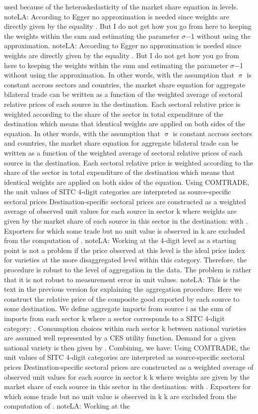 \documentclass[12pt,twoside,a4paper,notitlepage]{article}
\begin{document}
used because of the heteroskedasticity of the market share equation in levels. noteLA: According to Egger no approximation is needed since weights are directly given by the equality . But I do not get how you go from here to keeping the weights within the sum and estimating the parameter ${\sigma}$${-}$1 without using the approximation. noteLA: According to Egger no approximation is needed since weights are directly given by the equality . But I do not get how you go from here to keeping the weights within the sum and estimating the parameter ${\sigma}$${-}$1 without using the approximation. In other words, with the assumption that ${\upsigma}$ is constant accross sectors and countries, the market share equation for aggregate bilateral trade can be written as a function of the weighted average of sectoral relative prices of each source in the destination. Each sectoral relative price is weighted according to the share of the sector in total expenditure of the destination which means that identical weights are applied on both sides of the equation. In other words, with the assumption that ${\upsigma}$ is constant accross sectors and countries, the market share equation for aggregate bilateral trade can be written as a function of the weighted average of sectoral relative prices of each source in the destination. Each sectoral relative price is weighted according to the share of the sector in total expenditure of the destination which means that identical weights are applied on both sides of the equation. Using COMTRADE, the unit values of SITC 4-digit categories are interpreted as source-specific sectoral prices Destination-specific sectoral prices are constructed as a weighted average of observed unit values for each source in sector k where weights are given by the market share of each source in this sector in the destination: with . Exporters for which some trade but no unit value is observed in k are excluded from the computation of . noteLA: Working at the 4-digit level as a starting point is not a problem if the price observed at this level is the ideal price index for varieties at the more disaggregated level within this category. Therefore, the procedure is robust to the level of aggregation in the data. The problem is rather that it is not robust to measurement error in unit values. noteLA: This is the text in the previous version for explaining the aggregation procedure. Here we construct the relative price of the composite good exported by each source to some destination. We define aggregate imports from source i as the sum of imports from each sector k where a sector corresponds to a SITC 4-digit category: . Consumption choices within each sector k between national varieties are assumed well represented by a CES utility function. Demand for a given national variety is then given by . Combining, we have: Using COMTRADE, the unit values of SITC 4-digit categories are interpreted as source-specific sectoral prices Destination-specific sectoral prices are constructed as a weighted average of observed unit values for each source in sector k k where weights are given by the market share of each source in this sector in the destination: with . Exporters for which some trade but no unit value is observed in k k are excluded from the computation of . noteLA: Working at the 
\end{document}

